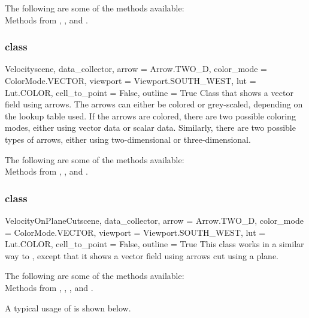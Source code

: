 The following are some of the methods available:\\
Methods from \ActorThreeD, \Clipper, \Rotation and \DataSetMapper.

\subsubsection{\Velocity class}

\begin{classdesc}{Velocity}{scene, data_collector, arrow = Arrow.TWO_D, 
color_mode = ColorMode.VECTOR, viewport = Viewport.SOUTH_WEST,  
lut = Lut.COLOR, cell_to_point = False, outline = True}
Class that shows a vector field using arrows. The arrows can either be 
colored or grey-scaled, depending on the lookup table used. If the arrows 
are colored, there are two possible coloring modes, either using vector data or 
scalar data. Similarly, there are two possible types of arrows, either 
using two-dimensional or three-dimensional.
\end{classdesc}

The following are some of the methods available:\\
Methods from \ActorThreeD, \GlyphThreeD, \MaskPoints and \DataSetMapper. 

\subsubsection{\VelocityOnPlaneCut class}

\begin{classdesc}{VelocityOnPlaneCut}{scene, data_collector,
arrow = Arrow.TWO_D, color_mode = ColorMode.VECTOR, 
viewport = Viewport.SOUTH_WEST, lut = Lut.COLOR, 
cell_to_point = False, outline = True}
This class works in a similar way to \MapOnPlaneCut, except that 
it shows a vector field using arrows cut using a plane.
\end{classdesc}

The following are some of the methods available:\\
Methods from \ActorThreeD, \GlyphThreeD, \Transform, \MaskPoints and 
\DataSetMapper. 

A typical usage of \VelocityOnPlaneCut is shown below.

